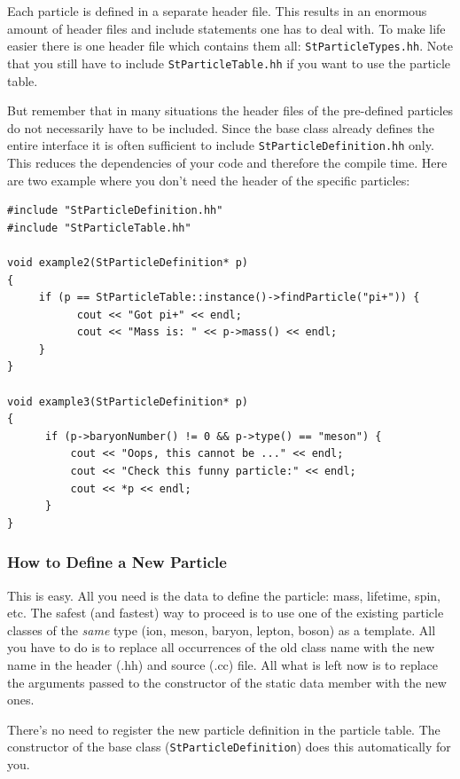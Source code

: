 \documentclass[twoside]{article}
\newcommand{\comp}[1]{\texttt{#1}}%
\begin{document}
Each particle is defined in a separate header file.
This results in an enormous amount of header files and include statements
one has to deal with. To make life easier there is one header file which contains
them all: \comp{StParticleTypes.hh}. Note that you still have to include
\comp{StParticleTable.hh} if you want to use the particle table.


But remember that in many situations the header files of the pre-defined particles
do not necessarily have to be included. Since the base class already defines the
entire interface it is often sufficient to include \comp{StParticleDefinition.hh} only. This
reduces the dependencies of your code and therefore the compile time.
Here are two example where you don't need the header of the specific particles: 

{\footnotesize
\begin{verbatim}
#include "StParticleDefinition.hh"
#include "StParticleTable.hh"

void example2(StParticleDefinition* p)
{
     if (p == StParticleTable::instance()->findParticle("pi+")) {
           cout << "Got pi+" << endl;
           cout << "Mass is: " << p->mass() << endl;
     }
}

void example3(StParticleDefinition* p)
{
      if (p->baryonNumber() != 0 && p->type() == "meson") {
          cout << "Oops, this cannot be ..." << endl;
          cout << "Check this funny particle:" << endl;
          cout << *p << endl;
      }
}
\end{verbatim}
}

\subsubsection{How to Define a New Particle}

This is easy. All you need is the data to define the particle: mass,
lifetime, spin, etc.  The safest (and fastest) way to proceed is to
use one of the existing particle classes of the \emph{same} type (ion,
meson, baryon, lepton, boson) as a template. All you have to do is to
replace all occurrences of the old class name with the new name in the
header (.hh) and source (.cc) file.  All what is left now is to
replace the arguments passed to the constructor of the static data
member with the new ones.

There's no need to register the new particle definition in the
particle table. The constructor of the base class
(\comp{StParticleDefinition}) does this automatically for you.
\end{document}
